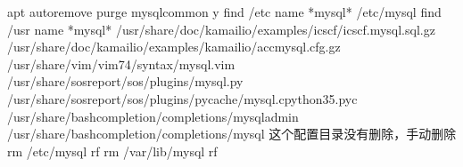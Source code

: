 \documentclass[a4paper,10pt,english]{sphinxmanual}
\begin{document}
\begin{itemize}
\begin{sphinxVerbatim}[commandchars=\\\{\}]
apt autoremove \PYGZhy{}\PYGZhy{}purge mysql\PYGZhy{}common \PYGZhy{}y
find /etc \PYGZhy{}name \PYGZdq{}*mysql*\PYGZdq{}
    /etc/mysql
find /usr \PYGZhy{}name \PYGZdq{}*mysql*\PYGZdq{}
    /usr/share/doc/kamailio/examples/icscf/icscf.mysql.sql.gz
    /usr/share/doc/kamailio/examples/kamailio/acc\PYGZhy{}mysql.cfg.gz
    /usr/share/vim/vim74/syntax/mysql.vim
    /usr/share/sosreport/sos/plugins/mysql.py
    /usr/share/sosreport/sos/plugins/\PYGZus{}\PYGZus{}pycache\PYGZus{}\PYGZus{}/mysql.cpython\PYGZhy{}35.pyc
    /usr/share/bash\PYGZhy{}completion/completions/mysqladmin
    /usr/share/bash\PYGZhy{}completion/completions/mysql
这个配置目录没有删除，手动删除
rm /etc/mysql \PYGZhy{}rf
rm /var/lib/mysql \PYGZhy{}rf
\end{sphinxVerbatim}

\end{itemize}
\end{document}
